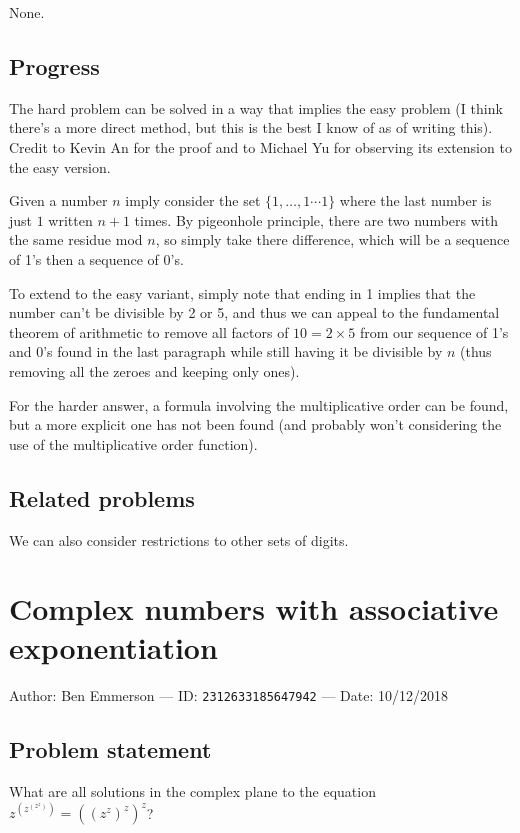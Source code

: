 \documentclass[10pt]{article}
\begin{document}
None.

\subsection{Progress}

The hard problem can be solved in a way that implies the easy problem (I think there's a more direct method, but this is the best I know of as of writing this). Credit to Kevin An for the proof and to Michael Yu for observing its extension to the easy version.

Given a number $n$ imply consider the set $\{1,\ldots,1\cdots 1\}$ where the last number is just $1$ written $n+1$ times. By pigeonhole principle, there are two numbers with the same residue mod $n$, so simply take there difference, which will be a sequence of 1's then a sequence of 0's.

To extend to the easy variant, simply note that ending in 1 implies that the number can't be divisible by 2 or 5, and thus we can appeal to the fundamental theorem of arithmetic to remove all factors of $10=2\times 5$ from our sequence of 1's and 0's found in the last paragraph while still having it be divisible by $n$ (thus removing all the zeroes and keeping only ones).

For the harder answer, a formula involving the multiplicative order can be found, but a more explicit one has not been found (and probably won't considering the use of the multiplicative order function).

\subsection{Related problems}

We can also consider restrictions to other sets of digits.

\pagebreak

\section{Complex numbers with associative exponentiation}

Author: Ben Emmerson --- ID: \verb`2312633185647942` --- Date: 10/12/2018

\subsection{Problem statement}

What are all solutions in the complex plane to the equation $z^{(z^{(z^z)})}=((z^z)^z)^z$?
\end{document}
